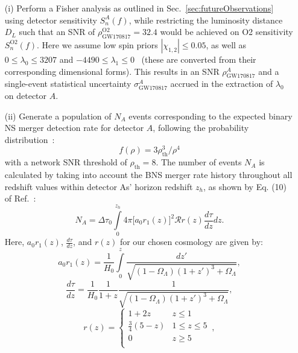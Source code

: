 \documentclass[prd,twocolumn,nofootinbib,superscriptaddress,amsmath,amssymb]{revtex4-1}
\begin{document}
\begin{enumerate}
\item[(i)] Perform a Fisher analysis as outlined in Sec.~\ref{sec:futureObservations} using detector sensitivity $S_n^A(f)$, while restricting the luminosity distance $D_L$ such that an SNR of $\rho^{\text{O2}}_{\text{GW170817}}=32.4$ would be achieved on O2 sensitivity $S_n^{\text{O2}}(f)$.
Here we assume low spin priors $|\chi_{1,2}| \leq 0.05$, as well as $0 \leq \lambda_0 \leq 3207$ and $-4490 \leq \lambda_1 \leq 0$~\cite{delPozzo:TaylorTidal} (these are converted from their corresponding dimensional forms).
This results in an SNR $\rho^A_{\text{GW170817}}$ and a single-event statistical uncertainty $\sigma_\text{GW170817}^A$ accrued in the extraction of $\lambda_0$ on detector $A$.

\item[(ii)] Generate a population of $N_A$ events corresponding to the expected binary NS merger detection rate for detector $A$, following the probability distribution~\cite{Shutz:SNR,Chen:SNR}:
\begin{equation}\label{eq:population}
f(\rho)=3 \rho_{\text{th}}^3/\rho^4
\end{equation}
with a network SNR threshold of $\rho_{\text{th}}=8$.
The number of events $N_A$ is calculated by taking into account the BNS merger rate history throughout all redshift values within detector As' horizon redshift $z_h$, as shown by Eq. (10) of Ref.~\cite{Cutler:BNSmerger}:
\begin{equation}
N_A=\Delta \tau_0 \int\limits^{z_{h}}_0 4 \pi \lbrack  a_0r_1(z)\rbrack^2 \mathcal{R} r(z) \frac{d \tau}{dz} dz.
\end{equation}
Here, $a_0r_1(z)$, $\frac{d\tau}{dz}$, and $r(z)$ for our chosen cosmology are given by:
\begin{equation}
a_0r_1(z) = \frac{1}{H_0}\int\limits^z_0 \frac{dz'}{\sqrt{(1-\Omega_{\Lambda})(1+z')^3+\Omega_{\Lambda}}},
\end{equation}
\begin{equation}
\frac{d\tau}{dz} = \frac{1}{H_0} \frac{1}{1+z}\frac{1}{\sqrt{(1-\Omega_{\Lambda})(1+z')^3+\Omega_{\Lambda}}},
\end{equation}
\begin{equation}
r(z) = \left\{
\begin{array}{ll}
      1+2z & z \leq 1 \\
      \frac{3}{4}(5-z) & 1\leq z\leq 5 \\
      0 & z\geq 5\\ 
\end{array}\,, 
\right.
\end{equation}


\end{enumerate}
\end{document}
